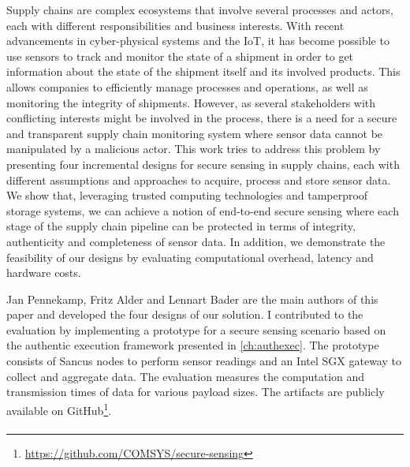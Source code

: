 Supply chains are complex ecosystems that involve several processes and actors,
each with different responsibilities and business interests. With recent
advancements in cyber-physical systems and the \ac{IoT}, it has become possible
to use sensors to track and monitor the state of a shipment in order to get
information about the state of the shipment itself and its involved products.
This allows companies to efficiently manage processes and operations, as well as
monitoring the integrity of shipments. However, as several stakeholders with
conflicting interests might be involved in the process, there is a need for a
secure and transparent supply chain monitoring system where sensor data cannot
be manipulated by a malicious actor. This work tries to address this problem by
presenting four incremental designs for secure sensing in supply chains, each
with different assumptions and approaches to acquire, process and store sensor
data. We show that, leveraging trusted computing technologies and tamperproof
storage systems, we can achieve a notion of end-to-end secure sensing where each
stage of the supply chain pipeline can be protected in terms of integrity,
authenticity and completeness of sensor data. In addition, we demonstrate the
feasibility of our designs by evaluating computational overhead, latency and
hardware costs.

Jan Pennekamp, Fritz Alder and Lennart Bader are the main authors of this paper
and developed the four designs of our solution. I contributed to the evaluation
by implementing a prototype for a secure sensing scenario based on the authentic
execution framework presented in \cref{ch:authexec}. The prototype consists of
Sancus nodes to perform sensor readings and an Intel \ac{SGX} gateway to collect
and aggregate data. The evaluation measures the computation and transmission
times of data for various payload sizes. The artifacts are publicly available on
GitHub\footnote{\url{https://github.com/COMSYS/secure-sensing}}.

\begin{formal}
    \papersupplyrefr{}
\end{formal}

\paragraph{\papersnptitle}

